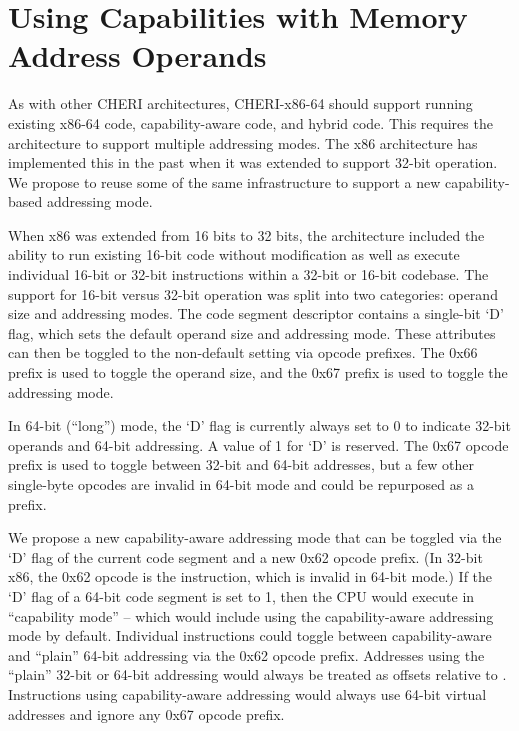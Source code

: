 \section{Using Capabilities with Memory Address Operands}

As with other CHERI architectures, CHERI-x86-64 should support running existing
x86-64 code, capability-aware code, and hybrid code.  This
requires the architecture to support multiple addressing modes.
The x86 architecture has implemented this in the past when it was
extended to support 32-bit operation.  We propose to reuse some of the
same infrastructure to support a new capability-based addressing
mode.

When x86 was extended from 16 bits to 32 bits, the architecture
included the ability to run existing 16-bit code without modification
as well as execute individual 16-bit or 32-bit instructions within a
32-bit or 16-bit codebase.  The support for 16-bit versus 32-bit
operation was
split into two categories: operand size and addressing modes.  The
code segment descriptor contains a single-bit `D' flag, which sets the
default operand size and addressing mode.  These attributes can then
be toggled to the non-default setting via opcode prefixes.  The 0x66
prefix is used to toggle the operand size, and the 0x67 prefix is used
to toggle the addressing mode.

In 64-bit (``long'') mode, the `D' flag is currently always set to
0 to indicate 32-bit operands and 64-bit addressing.  A value of
1 for `D' is reserved.  The 0x67 opcode prefix is used to toggle
between 32-bit and 64-bit addresses, but a few other single-byte opcodes
are invalid in 64-bit mode and could be repurposed as a prefix.

We propose a new capability-aware addressing mode that can be
toggled via the `D' flag of the current code segment and a new 0x62
opcode prefix.  (In 32-bit x86, the 0x62 opcode is the
 instruction, which is invalid in 64-bit mode.)
If the `D' flag of a 64-bit code segment is set to 1,
then the CPU would execute in ``capability mode'' -- which would include
using the capability-aware addressing mode by default.  Individual
instructions could toggle between capability-aware and ``plain''
64-bit addressing via the 0x62 opcode prefix.  Addresses using the
``plain'' 32-bit or 64-bit addressing would always be treated as offsets
relative to \DDC{}.  Instructions using capability-aware addressing
would always use 64-bit virtual addresses and ignore any 0x67 opcode
prefix.

